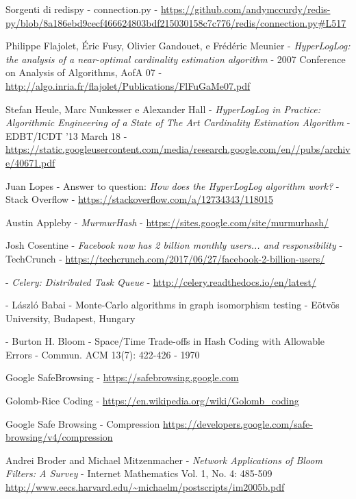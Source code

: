 \begin{thebibliography}{99}
	Sorgenti di redispy - connection.py -
	\url{https://github.com/andymccurdy/redis-py/blob/8a186ebd9cecf466624803bdf215030158c7c776/redis/connection.py\#L517}

	Philippe Flajolet, Éric Fusy, Olivier Gandouet, e Frédéric Meunier -
	\emph{HyperLogLog: the analysis of a near-optimal cardinality estimation algorithm} -
	2007 Conference on Analysis of Algorithms, AofA 07 -
	\url{http://algo.inria.fr/flajolet/Publications/FlFuGaMe07.pdf}

	Stefan Heule, Marc Nunkesser e Alexander Hall -
	\emph{HyperLogLog in Practice: Algorithmic Engineering of a State of The Art Cardinality Estimation Algorithm} -
	EDBT/ICDT ’13 March 18 - 
	\url{https://static.googleusercontent.com/media/research.google.com/en//pubs/archive/40671.pdf}

	Juan Lopes -
	Answer to question: \emph{How does the HyperLogLog algorithm work?} -
	Stack Overflow -
	\url{https://stackoverflow.com/a/12734343/118015}

	Austin Appleby -
	\emph{MurmurHash} -
	\url{https://sites.google.com/site/murmurhash/}

	Josh Cosentine -
	\emph{Facebook now has 2 billion monthly users... and responsibility} -
	TechCrunch -
	\url{https://techcrunch.com/2017/06/27/facebook-2-billion-users/}

 -
	\emph{Celery: Distributed Task Queue} -
	\url{http://celery.readthedocs.io/en/latest/}

 -
	László Babai -
 	Monte-Carlo algorithms in graph isomorphism testing -
 	Eötvös University, Budapest, Hungary

 -
	Burton H. Bloom -
	Space/Time Trade-offs in Hash Coding with Allowable Errors -
	Commun. ACM 13(7): 422-426 -
	1970

	Google SafeBrowsing -
	\url{https://safebrowsing.google.com}

	Golomb-Rice Coding -
	\url{https://en.wikipedia.org/wiki/Golomb_coding}

	Google Safe Browsing - Compression
	\url{https://developers.google.com/safe-browsing/v4/compression}

	Andrei Broder and Michael Mitzenmacher -
	\emph{Network Applications of Bloom Filters: A Survey} -
	Internet Mathematics Vol. 1, No. 4: 485-509
	\url{http://www.eecs.harvard.edu/~michaelm/postscripts/im2005b.pdf}


\end{thebibliography}
